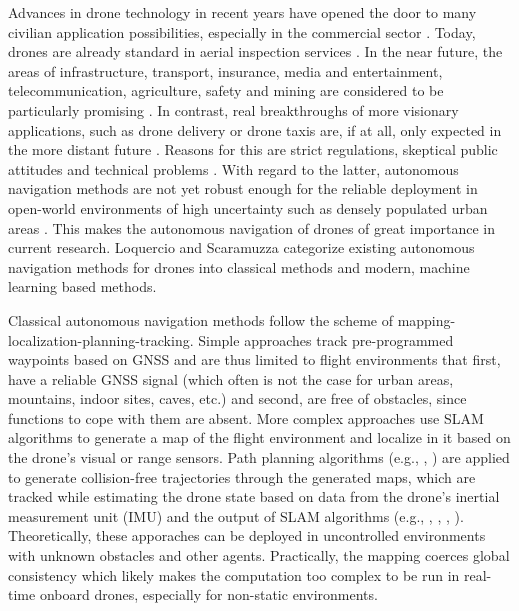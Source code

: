 Advances in drone technology in recent years
have opened the door to many civilian application possibilities,
especially in the commercial sector \cite{Dunn}.
Today, drones are already standard in 
aerial inspection services
\cite{Cohn, Equinox, Abuhasira}.
In the near future, the areas of
infrastructure,
transport,
insurance,
media and entertainment,
telecommunication,
agriculture,
safety
and mining 
are considered to be particularly promising \cite{Mazur2016a}.
In contrast, 
real breakthroughs of more visionary applications, 
such as drone delivery or drone taxis
are, if at all, only expected in the more distant future \cite{Rosen2019}.
Reasons for this are strict
regulations, skeptical public attitudes
and technical problems \cite{Rosen2019}.
With regard to the latter,
autonomous navigation methods are not yet 
robust enough for the reliable deployment in 
open-world environments of high uncertainty such as
densely populated urban areas \cite{brunner2019urban}.
This makes the autonomous navigation of drones
of great importance in current research.
Loquercio and Scaramuzza \cite{Loquercio2018a} 
categorize existing autonomous navigation methods for drones 
into classical methods and modern, machine learning based methods.

Classical autonomous navigation methods 
follow the scheme of mapping-localization-planning-tracking.
Simple approaches track pre-programmed waypoints based on GNSS
and are thus limited to flight environments that
first, have a reliable GNSS signal
(which often is not the case for 
urban areas, mountains, indoor sites, caves, etc.)
and second, are free of obstacles,
since functions to cope with them are absent.
More complex approaches use SLAM algorithms
to generate a map of the flight environment
and localize in it
based on the drone's visual or range sensors. \cite{MurArtal2015}
Path planning algorithms 
(e.g., \cite{Bircher2016}, \cite{Cieslewski2017})
are applied to generate collision-free 
trajectories through the generated maps,
which are tracked
while estimating the drone state
based on data from the drone's inertial measurement unit (IMU)
and the output of SLAM algorithms 
(e.g., \cite{Lin2017}, \cite{Scaramuzza2014}, \cite{Sa2018}, \cite{Loianno2017}).
Theoretically, these apporaches can be deployed
in uncontrolled environments with unknown obstacles and other agents.
Practically, 
the mapping coerces global consistency
which likely makes the computation too complex 
to be run in real-time onboard drones,
especially for non-static environments.

